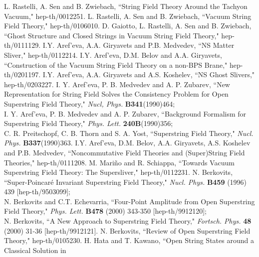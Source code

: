 \documentclass[a4paper,12pt]{article}
\begin{document}

\begin{thebibliography}{999}
L. Rastelli, A. Sen and B. Zwiebach, ``String Field Theory Around the 
 Tachyon Vacuum," hep-th/0012251.
L. Rastelli, A. Sen and B. Zwiebach, ``Vacuum String Field Theory," hep-th/0106010. 
D. Gaiotto, L. Rastelli, A. Sen and B. Zwiebach, ``Ghost Structure and Closed Strings 
 in Vacuum String Field Theory," hep-th/0111129. 
I.Y. Aref'eva, A.A. Giryavets and P.B. Medvedev, ``NS Matter Sliver," hep-th/0112214. 
I.Y. Aref'eva, D.M. Belov and A.A. Giryavets, ``Construction of the Vacuum String Field Theory 
 on a non-BPS Brane," hep-th/0201197. 
I.Y. Aref'eva, A.A. Giryavets and A.S. Koshelev, ``NS Ghost Slivers," hep-th/0203227. 
 I. Y. Aref'eva, P. B. Medvedev and A. P. Zubarev, ``New 
 Representation for String Field Solves the Consistency 
 Problem for Open Superstring Field Theory," 
 \textit{Nucl, Phys. } \textbf{B341}(1990)464; \vspace{2mm} \\
 I. Y. Aref'eva, P. B. Medvedev and A. P. Zubarev, 
 ``Background Formalism for Superstring Field Theory," 
 \textit{Phys. Lett. } \textbf{240B}(1990)356; \vspace{2mm} \\
 C. R. Preitschopf, C. B. Thorn and S. A. Yost, ``Superstring Field Theory," 
 \textit{Nucl. Phys. } \textbf{B337}(1990)363.
I.Y. Aref'eva, D.M. Belov, A.A. Giryavets, A.S. Koshelev and P.B. Medvedev, ``Noncommutative 
 Field Theories and (Super)String Field Theories," hep-th/0111208.
M. Mari\~{n}o and R. Schiappa, ``Towards Vacuum Superstring Field Theory: The Supersliver," 
 hep-th/0112231.
N. Berkovits, ``Super-Poincar\'{e} Invariant Superstring Field Theory," 
 \textit{Nucl. Phys.} \textbf{B459} (1996) 439 [hep-th/9503099]; \vspace{2mm} \\
 N. Berkovits and C.T. Echevarria, ``Four-Point Amplitude from Open Superstring 
 Field Theory," \textit{Phys. Lett.} \textbf{B478} (2000) 343-350 [hep-th/9912120]; \vspace{2mm} \\
 N. Berkovits, ``A New Approach to Superstring Field Theory," \textit{Fortsch. Phys.} 
 \textbf{48} (2000) 31-36 [hep-th/9912121].
N. Berkovits, ``Review of Open Superstring Field Theory," hep-th/0105230.
H. Hata and T. Kawano, ``Open String States around a Classical Solution in 

\end{thebibliography}
\end{document}
